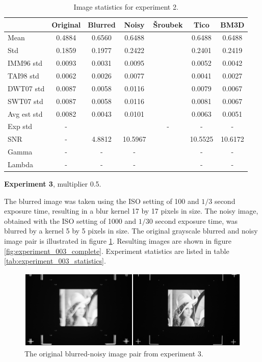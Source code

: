 \documentclass[12pt,notitlepage]{report}
\begin{document}
\begin{table}
  \begin{center}
  \begin{tabular}{ | l | c | c | c | c | c | c | }
    \hline
		& Original & Blurred & Noisy & Šroubek & Tico & BM3D \\ \hline 
	Mean & 0.4884 & 0.6560 & 0.6488 &  & 0.6488 & 0.6488 \\ \hline 
	Std & 0.1859 & 0.1977 & 0.2422 &  & 0.2401 & 0.2419 \\ \hline 
	IMM96 std & 0.0093 & 0.0031 & 0.0095 &  & 0.0052 & 0.0042 \\ \hline 
	TAI98 std  & 0.0062 & 0.0026 & 0.0077 &  & 0.0041 & 0.0027 \\ \hline 
	DWT07 std  & 0.0087 & 0.0058 & 0.0116 &  & 0.0079 & 0.0067 \\ \hline 
	SWT07 std & 0.0087 & 0.0058 & 0.0116 &  & 0.0081 & 0.0067 \\ \hline 
	Avg est std & 0.0082 & 0.0043 & 0.0101 &  & 0.0063 & 0.0051 \\ \hline 
	Exp std & - &  &  & - & - & - \\ \hline 
	SNR     & - & 4.8812 & 10.5967 &  & 10.5525 & 10.6172 \\ \hline 
	Gamma & - & - & - &  & - & - \\ \hline 
	Lambda & - & - & - &  & - & - \\ \hline 

  \end{tabular}
  \end{center}
  \caption{Image statistics for experiment 2.}
  \label{tab:experiment_002_statistics}
\end{table}

\noindent \textbf{Experiment 3}, multiplier 0.5.

The blurred image was taken using the ISO setting of 100 and $1/3$ second exposure time, resulting in a blur kernel 17 by 17 pixels in size. The noisy image, obtained with the ISO setting of 1000 and $1/30$ second exposure time, was blurred by a kernel 5 by 5 pixels in size. The original grayscale blurred and noisy image pair is illustrated in figure \ref{fig:experiment_003_blurred_noisy}. Resulting images are shown in figure \ref{fig:experiment_003_complete}. Experiment statistics are listed in table \ref{tab:experiment_003_statistics}.

\begin{figure}[htb]
 \begin{center}
  \includegraphics[width=12cm]{experiment_003_blurred_noisy.png}
 \end{center}
 \caption{The original blurred-noisy image pair from experiment 3.}
 \label{fig:experiment_003_blurred_noisy}
\end{figure}
\end{document}
